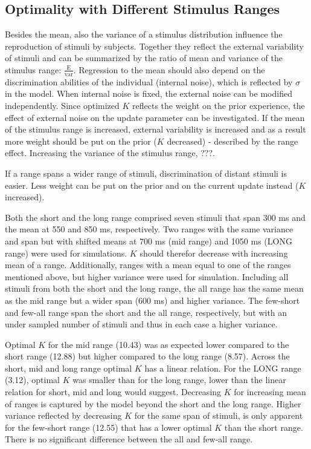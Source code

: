\documentclass[10pt]{article}
\begin{document}
\subsection{Optimality with Different Stimulus Ranges}
Besides the mean, also the variance of a stimulus distribution influence the reproduction of stimuli by subjects. Together they reflect the external variability of stimuli and can be summarized by the ratio of mean and variance of the stimulus range: $\frac{\text{E}}{\text{var}}$.
Regression to the mean should also depend on the discrimination abilities of the individual (internal noise), which is reflected by $\sigma$ in the model.
When internal noise is fixed, the external noise can be modified independently. Since optimized $K$ reflects the weight on the prior experience, the effect of external noise on the update parameter can be investigated.
If the mean of the stimulus range is increased, external variability is increased and as a result more weight should be put on the prior ($K$ decreased) - described by the range effect. 
Increasing the variance of the stimulus range, ???.

If a range spans a wider range of stimuli, discrimination of distant stimuli is easier. Less weight can be put on the prior and on the current update instead ($K$ increased). 

Both the short and the long range comprised seven stimuli that span 300 ms and the mean at 550 and 850 ms, respectively. Two ranges with the same variance and span but with shifted means at 700 ms (mid range) and 1050 ms (LONG range) were used for simulations. $K$ should therefor decrease with increasing mean of a range. 
Additionally, ranges with a mean equal to one of the ranges mentioned above, but higher variance were used for simulation.
Including all stimuli from both the short and the long range, the all range has the same mean as the mid range but a wider span (600 ms) and higher variance.
The few-short and few-all range span the short and the all range, respectively, but with an under sampled number of stimuli and thus in each case a higher variance. 

Optimal $K$ for the mid range (10.43) was as expected lower compared to the short range (12.88) but higher compared to the long range (8.57). Across the short, mid and long range optimal $K$ has a linear relation.
For the LONG range (3.12), optimal $K$ was smaller than for the long range, lower than the linear relation for short, mid and long would suggest.
Decreasing $K$ for increasing mean of ranges is captured by the model beyond the short and the long range.  
Higher variance reflected by decreasing $K$ for the same span of stimuli, is only apparent for the few-short range (12.55) that has a lower optimal $K$ than the short range. 
There is no significant difference between the all and few-all range. 
\end{document}
